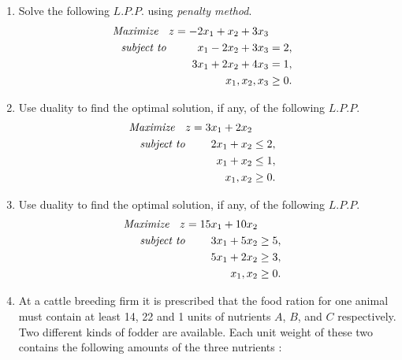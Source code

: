\documentclass[11pt, a4paper]{article}
\begin{document}
\begin{enumerate}

\item Solve the following $L.P.P.$ using \textit{penalty method}.
	\begin{align*}
\textit{Maximize \hspace{6pt}} z = -2x_1 + x_2 + 3x_3 \\
\textit{subject to \hspace{25pt}} x_1 - 2x_2 + 3x_3 &= 2, \\
3x_1 + 2x_2 + 4x_3 &= 1, \\
x_1, x_2, x_3 &\geq 0.
	\end{align*}
	
	
	

\item Use duality to find the optimal solution, if any, of the following $L.P.P.$
	\begin{align*}
\textit{Maximize \hspace{6pt}} z = 3x_1 + 2x_2 \\
\textit{subject to \hspace{20pt}} 2x_1 + x_2 &\leq 2, \\
x_1 + x_2 &\leq 1, \\
x_1, x_2 &\geq 0.
	\end{align*}
	
	



\item Use duality to find the optimal solution, if any, of the following $L.P.P.$
	\begin{align*}
\textit{Maximize \hspace{6pt}} z = 15x_1 + 10x_2 \\
\textit{subject to \hspace{20pt}} 3x_1 + 5x_2 &\geq 5, \\
5x_1 + 2x_2 &\geq 3, \\
x_1, x_2 &\geq 0.
	\end{align*}
	
	
\newpage




\item At a cattle breeding firm it is prescribed that the food ration for one animal must contain at least 14, 22 and 1 units of nutrients $A$, $B$, and $C$ respectively. Two different kinds of fodder are available. Each unit weight of these two contains the following amounts of the three nutrients :


\end{enumerate}
\end{document}
